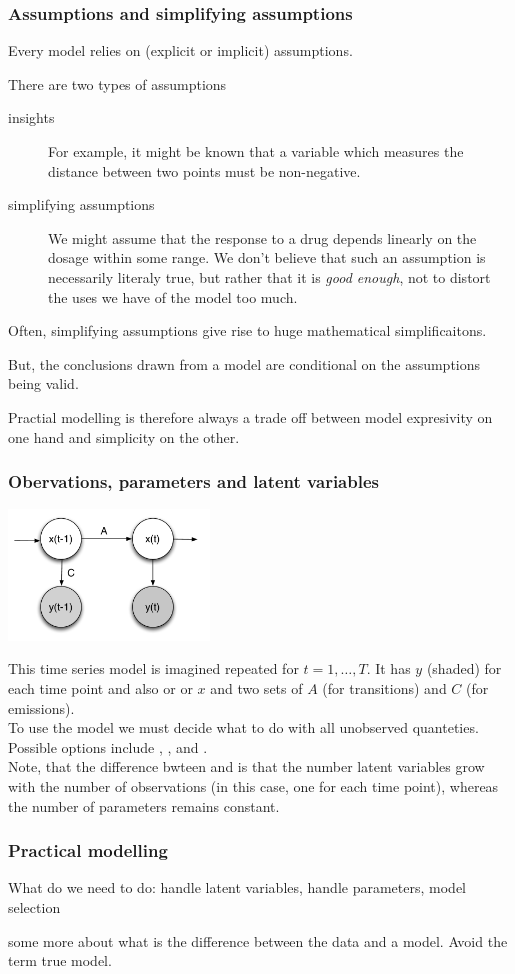 \begin{frame}
\frametitle{Assumptions and simplifying assumptions}

Every model relies on (explicit or implicit) assumptions.


There are two types of assumptions
\begin{description}
\item[insights] For example, it might be known that a variable which measures the distance between two points must be non-negative.
\item[simplifying assumptions] We might assume that the response to a drug depends linearly on the dosage within some range. We don't believe that such an assumption is necessarily literaly true, but rather that it is \emph{good enough}, not to distort the uses we have of the model too much.
\end{description}

Often, simplifying assumptions give rise to huge mathematical simplificaitons.

But, the conclusions drawn from a model are conditional on the assumptions being valid.

Practial modelling is therefore always a trade off between model expresivity on one hand and simplicity on the other.
\end{frame}


\begin{frame}
\frametitle{Obervations, parameters and latent variables}

\centerline{\includegraphics[width=0.4\textwidth]{d1.pdf}}

This time series model is imagined repeated for $t=1,\ldots,T$. It has  $y$ (shaded) for each time point and also  or  or  $x$ and two sets of  $A$ (for transitions) and $C$ (for emissions).\\[1ex]

To use the model we must decide what to do with all unobserved quanteties. Possible options include , ,  and .\\[1ex]

Note, that the difference bwteen  and  is that the number latent variables grow with the number of observations (in this case, one for each time point), whereas the number of parameters remains constant.
\end{frame}


\begin{frame}
\frametitle{Practical modelling}

What do we need to do: handle latent variables, handle parameters, model selection
\end{frame}

\begin{frame}
some more about what is the difference between the data and a model. Avoid the term true model.
\end{frame}


  